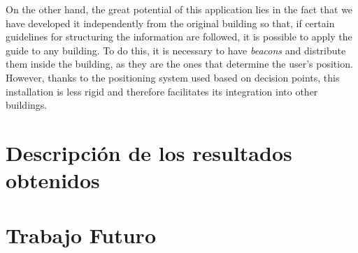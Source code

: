 On the other hand, the great potential of this application lies in the fact that we have developed it independently from the original building so that, if certain guidelines for structuring the information are followed, it is possible to apply the guide to any building. To do this, it is necessary to have \textit{beacons} and distribute them inside the building, as they are the ones that determine the user's position. However, thanks to the positioning system used based on decision points, this installation is less rigid and therefore facilitates its integration into other buildings. 


\section{Descripción de los resultados obtenidos}
\label{sec:descResult_eng}



\section{Trabajo Futuro}
\label{sec:trabajoFuturo_eng}


